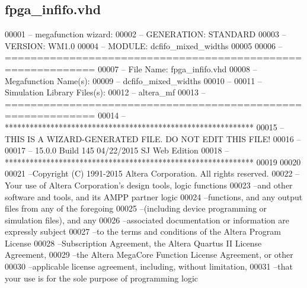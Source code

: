 \subsection{fpga\+\_\+infifo.\+vhd}
\label{fpga__infifo_8vhd_source}

\begin{DoxyCode}
00001 \textcolor{keyword}{-- megafunction wizard: %
00002 \textcolor{keyword}{-- GENERATION: STANDARD}
00003 \textcolor{keyword}{-- VERSION: WM1.0}
00004 \textcolor{keyword}{-- MODULE: dcfifo\_mixed\_widths }
00005 
00006 \textcolor{keyword}{-- ============================================================}
00007 \textcolor{keyword}{-- File Name: fpga\_infifo.vhd}
00008 \textcolor{keyword}{-- Megafunction Name(s):}
00009 \textcolor{keyword}{--          dcfifo\_mixed\_widths}
00010 \textcolor{keyword}{--}
00011 \textcolor{keyword}{-- Simulation Library Files(s):}
00012 \textcolor{keyword}{--          altera\_mf}
00013 \textcolor{keyword}{-- ============================================================}
00014 \textcolor{keyword}{-- ************************************************************}
00015 \textcolor{keyword}{-- THIS IS A WIZARD-GENERATED FILE. DO NOT EDIT THIS FILE!}
00016 \textcolor{keyword}{--}
00017 \textcolor{keyword}{-- 15.0.0 Build 145 04/22/2015 SJ Web Edition}
00018 \textcolor{keyword}{-- ************************************************************}
00019 
00020 
00021 \textcolor{keyword}{--Copyright (C) 1991-2015 Altera Corporation. All rights reserved.}
00022 \textcolor{keyword}{--Your use of Altera Corporation's design tools, logic functions }
00023 \textcolor{keyword}{--and other software and tools, and its AMPP partner logic }
00024 \textcolor{keyword}{--functions, and any output files from any of the foregoing }
00025 \textcolor{keyword}{--(including device programming or simulation files), and any }
00026 \textcolor{keyword}{--associated documentation or information are expressly subject }
00027 \textcolor{keyword}{--to the terms and conditions of the Altera Program License }
00028 \textcolor{keyword}{--Subscription Agreement, the Altera Quartus II License Agreement,}
00029 \textcolor{keyword}{--the Altera MegaCore Function License Agreement, or other }
00030 \textcolor{keyword}{--applicable license agreement, including, without limitation, }
00031 \textcolor{keyword}{--that your use is for the sole purpose of programming logic }
}
\end{DoxyCode}
